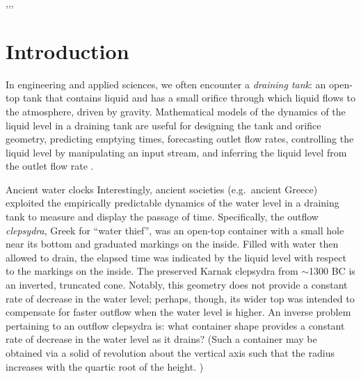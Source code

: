 \documentclass[a4paper,fleqn]{cas-dc}
\begin{document}

\begin{keywords}
  \sep \sep \sep
\end{keywords}

\maketitle


\section{Introduction}
In engineering and applied sciences, we often encounter a \emph{draining tank}:
an open-top tank that contains liquid and has a small orifice through which liquid flows to the atmosphere, driven by gravity.
Mathematical models of the dynamics of the liquid level in a draining tank are useful for designing the tank and orifice geometry, predicting emptying times, forecasting outlet flow rates, controlling the liquid level by manipulating an input stream, and inferring the liquid level from the outlet flow rate \cite{d2021torricelli,seborg2016process,groetsch1993inverse_tl,groetsch1999inverse}.

\begin{mytcbox}[label=box:waterclocks, breakable]{Ancient water clocks}
Interestingly, ancient societies (e.g.\ ancient Greece) exploited the empirically predictable dynamics of the water level in a draining tank to measure and display the passage of time.
Specifically, the outflow \emph{clepsydra}, Greek for ``water thief'', was an open-top container with a small hole near its bottom and graduated markings on the inside. 
Filled with water then allowed to drain, the elapsed time was indicated by the liquid level with respect to the markings on the inside. \cite{bedini1962compartmented,hwang2021historical,ritner2016oriental,hejun1987research,schomberg2018karnak,mills1982newton}
The preserved Karnak clepsydra from $\sim$1300 BC \cite{schomberg2018karnak} is an inverted, truncated cone. Notably, this geometry does not provide a constant rate of decrease in the water level; perhaps, though, its wider top was intended to compensate for faster outflow when the water level is higher. An inverse problem pertaining to an outflow clepsydra is: what container shape provides a constant rate of decrease in the water level as it drains?
(Such a container may be obtained via a solid of revolution about the vertical axis such that the radius increases with the quartic root of the height. \cite{mills1982newton,d2021torricelli})
\end{mytcbox}
\end{document}
